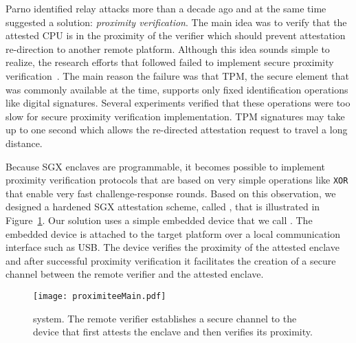 Parno identified relay attacks more than a decade ago and at the same time suggested a solution: \emph{proximity verification}. The main idea was to verify that the attested CPU is in the proximity of the verifier which should prevent attestation re-direction to another remote platform. Although this idea sounds simple to realize, the research efforts that followed failed to implement secure proximity verification~\cite{x}. The main reason the failure was that TPM, the secure element that was commonly available at the time, supports only fixed identification operations like digital signatures. Several experiments verified that these operations were too slow for secure proximity verification implementation. TPM signatures may take up to one second which allows the re-directed attestation request to travel a long distance.

Because SGX enclaves are programmable, it becomes possible to implement proximity verification protocols that are based on very simple operations like \texttt{XOR} that enable very fast challenge-response rounds. Based on this observation, we designed a hardened SGX attestation scheme, called \proximitee, that is illustrated in Figure~\ref{fig:proximitee}. Our solution uses a simple embedded device that we call \key. The embedded device is attached to the target platform over a local communication interface such as USB. The \key device verifies the proximity of the attested enclave and after successful proximity verification it facilitates the creation of a secure channel between the remote verifier and the attested enclave. 

\begin{figure}[t]
 \centering
  \texttt{[image: proximiteeMain.pdf]}
 \caption{\proximitee system. The remote verifier establishes a secure channel to the \key device that first attests the enclave and then verifies its proximity.}
 \label{fig:proximitee}
\end{figure}

